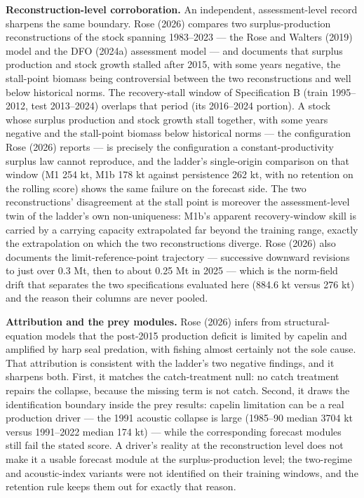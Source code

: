 \documentclass[11pt]{article}
\begin{document}
\textbf{Reconstruction-level corroboration.} An independent,
assessment-level record sharpens the same boundary. Rose (2026) compares
two surplus-production reconstructions of the stock spanning 1983--2023
--- the Rose and Walters (2019) model and the DFO (2024a) assessment
model --- and documents that surplus production and stock growth stalled
after 2015, with some years negative, the stall-point biomass being
controversial between the two reconstructions and well below historical
norms. The recovery-stall window of Specification B (train 1995--2012,
test 2013--2024) overlaps that period (its 2016--2024 portion). A stock
whose surplus production and stock growth stall together, with some
years negative and the stall-point biomass below historical norms ---
the configuration Rose (2026) reports --- is precisely the configuration
a constant-productivity surplus law cannot reproduce, and the ladder's
single-origin comparison on that window (M1 254 kt, M1b 178 kt against
persistence 262 kt, with no retention on the rolling score) shows the
same failure on the forecast side. The two reconstructions' disagreement
at the stall point is moreover the assessment-level twin of the ladder's
own non-uniqueness: M1b's apparent recovery-window skill is carried by a
carrying capacity extrapolated far beyond the training range, exactly
the extrapolation on which the two reconstructions diverge. Rose (2026)
also documents the limit-reference-point trajectory --- successive
downward revisions to just over 0.3 Mt, then to about 0.25 Mt in 2025
--- which is the norm-field drift that separates the two specifications
evaluated here (884.6 kt versus 276 kt) and the reason their columns are
never pooled.

\textbf{Attribution and the prey modules.} Rose (2026) infers from
structural-equation models that the post-2015 production deficit is
limited by capelin and amplified by harp seal predation, with fishing
almost certainly not the sole cause. That attribution is consistent with
the ladder's two negative findings, and it sharpens both. First, it
matches the catch-treatment null: no catch treatment repairs the
collapse, because the missing term is not catch. Second, it draws the
identification boundary inside the prey results: capelin limitation can
be a real production driver --- the 1991 acoustic collapse is large
(1985--90 median 3704 kt versus 1991--2022 median 174 kt) --- while the
corresponding forecast modules still fail the stated score. A driver's
reality at the reconstruction level does not make it a usable forecast
module at the surplus-production level; the two-regime and
acoustic-index variants were not identified on their training windows,
and the retention rule keeps them out for exactly that reason.
\end{document}
